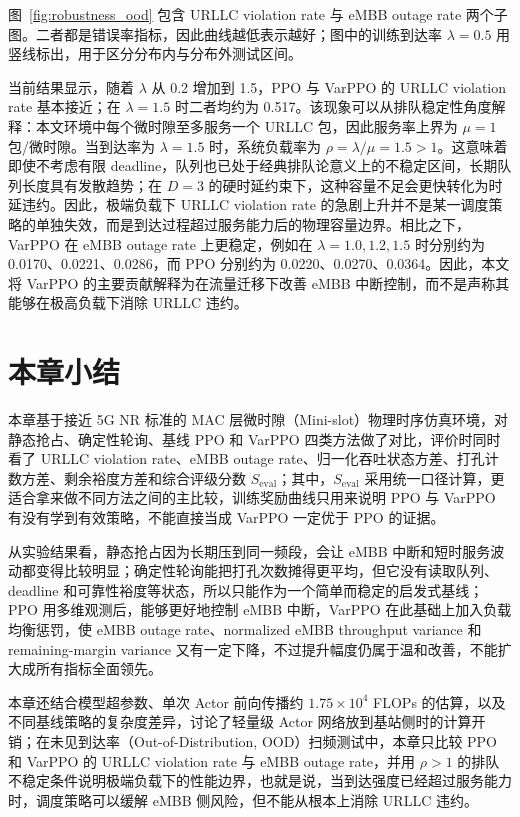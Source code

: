 图~\ref{fig:robustness_ood} 包含 URLLC violation rate 与 eMBB outage rate 两个子图。二者都是错误率指标，因此曲线越低表示越好；图中的训练到达率 \(\lambda=0.5\) 用竖线标出，用于区分分布内与分布外测试区间。

当前结果显示，随着 \(\lambda\) 从 0.2 增加到 1.5，PPO 与 VarPPO 的 URLLC violation rate 基本接近；在 \(\lambda=1.5\) 时二者均约为 0.517。该现象可以从排队稳定性角度解释：本文环境中每个微时隙至多服务一个 URLLC 包，因此服务率上界为 \(\mu=1\) 包/微时隙。当到达率为 \(\lambda=1.5\) 时，系统负载率为 \(\rho=\lambda/\mu=1.5>1\)。这意味着即使不考虑有限 deadline，队列也已处于经典排队论意义上的不稳定区间，长期队列长度具有发散趋势；在 \(D=3\) 的硬时延约束下，这种容量不足会更快转化为时延违约。因此，极端负载下 URLLC violation rate 的急剧上升并不是某一调度策略的单独失效，而是到达过程超过服务能力后的物理容量边界。相比之下，VarPPO 在 eMBB outage rate 上更稳定，例如在 \(\lambda=1.0,1.2,1.5\) 时分别约为 0.0170、0.0221、0.0286，而 PPO 分别约为 0.0220、0.0270、0.0364。因此，本文将 VarPPO 的主要贡献解释为在流量迁移下改善 eMBB 中断控制，而不是声称其能够在极高负载下消除 URLLC 违约。

\section{本章小结}\label{47-ux672cux7ae0ux5c0fux7ed3}

本章基于接近 5G NR 标准的 MAC 层微时隙（Mini-slot）物理时序仿真环境，对静态抢占、确定性轮询、基线 PPO 和 VarPPO 四类方法做了对比，评价时同时看了 URLLC violation rate、eMBB outage rate、归一化吞吐状态方差、打孔计数方差、剩余裕度方差和综合评级分数 \(S_{\text{eval}}\)；其中，\(S_{\text{eval}}\) 采用统一口径计算，更适合拿来做不同方法之间的主比较，训练奖励曲线只用来说明 PPO 与 VarPPO 有没有学到有效策略，不能直接当成 VarPPO 一定优于 PPO 的证据。

从实验结果看，静态抢占因为长期压到同一频段，会让 eMBB 中断和短时服务波动都变得比较明显；确定性轮询能把打孔次数摊得更平均，但它没有读取队列、deadline 和可靠性裕度等状态，所以只能作为一个简单而稳定的启发式基线；PPO 用多维观测后，能够更好地控制 eMBB 中断，VarPPO 在此基础上加入负载均衡惩罚，使 eMBB outage rate、normalized eMBB throughput variance 和 remaining-margin variance 又有一定下降，不过提升幅度仍属于温和改善，不能扩大成所有指标全面领先。

本章还结合模型超参数、单次 Actor 前向传播约 \(1.75\times10^4\) FLOPs 的估算，以及不同基线策略的复杂度差异，讨论了轻量级 Actor 网络放到基站侧时的计算开销；在未见到达率（Out-of-Distribution, OOD）扫频测试中，本章只比较 PPO 和 VarPPO 的 URLLC violation rate 与 eMBB outage rate，并用 \(\rho>1\) 的排队不稳定条件说明极端负载下的性能边界，也就是说，当到达强度已经超过服务能力时，调度策略可以缓解 eMBB 侧风险，但不能从根本上消除 URLLC 违约。

